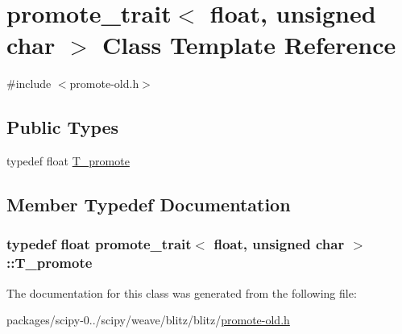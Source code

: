 \hypertarget{classpromote__trait_3_01float_00_01unsigned_01char_01_4}{}\section{promote\+\_\+trait$<$ float, unsigned char $>$ Class Template Reference}
\label{classpromote__trait_3_01float_00_01unsigned_01char_01_4}


{\ttfamily \#include $<$promote-\/old.\+h$>$}

\subsection*{Public Types}
\begin{DoxyCompactItemize}
\item 
typedef float \hyperlink{classpromote__trait_3_01float_00_01unsigned_01char_01_4_a4ad11f6ac0ee4b3bfcf8070b982541bd}{T\+\_\+promote}
\end{DoxyCompactItemize}


\subsection{Member Typedef Documentation}
\hypertarget{classpromote__trait_3_01float_00_01unsigned_01char_01_4_a4ad11f6ac0ee4b3bfcf8070b982541bd}{}
\subsubsection[{T\+\_\+promote}]{\setlength{\rightskip}{0pt plus 5cm}typedef float {\bf promote\+\_\+trait}$<$ float, unsigned char $>$\+::{\bf T\+\_\+promote}}\label{classpromote__trait_3_01float_00_01unsigned_01char_01_4_a4ad11f6ac0ee4b3bfcf8070b982541bd}


The documentation for this class was generated from the following file\+:\begin{DoxyCompactItemize}
\item 
packages/scipy-\/0../scipy/weave/blitz/blitz/\hyperlink{promote-old_8h}{promote-\/old.\+h}\end{DoxyCompactItemize}
